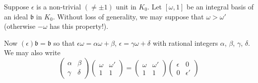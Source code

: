 Suppose $\epsilon$ is a non-trivial $(\neq \pm 1)$ unit in
$K_{0}$. Let $[\omega,1]$ be an integral basis of an ideal
$\mathfrak{b}$ in $K_{0}$. Without loss of generality, we may suppose
that $\omega>\omega'$ (otherwise $-\omega$ has this property!).

Now $(\epsilon)\mathfrak{b}=\mathfrak{b}$ so that
$\epsilon\omega=\alpha\omega+\beta$, $\epsilon=\gamma\omega+\delta$
with rational integers $\alpha$, $\beta$, $\gamma$, $\delta$. We may
also write
$$
\begin{pmatrix}
\alpha & \beta\\
\gamma & \delta
\end{pmatrix}
\begin{pmatrix}
\omega & \omega'\\
1 & 1
\end{pmatrix}
=
\begin{pmatrix}
\omega & \omega'\\
1 & 1
\end{pmatrix}
\begin{pmatrix}
\epsilon & 0\\
0 & \epsilon'
\end{pmatrix}
$$


